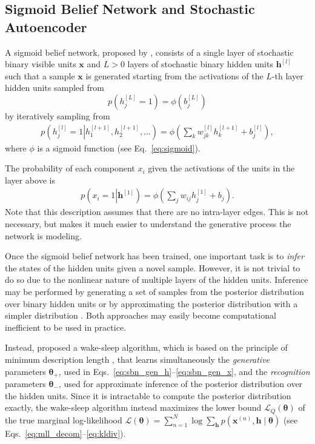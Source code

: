 \documentclass{now}
\newcommand{\qlay}[1]{\left[#1\right]}
\newcommand{\vect}[1]{\mathbf{#1}}
\newcommand{\vects}[1]{\boldsymbol{#1}}
\newcommand{\vh}[0]{\vect{h}}
\newcommand{\vx}[0]{\vect{x}}
\newcommand{\TT}[0]{{\vects{\theta}}}
\newcommand{\LL}[0]{\mathcal{L}}
\begin{document}
\subsection{Sigmoid Belief Network and Stochastic Autoencoder}
\label{sec:sbn_dbn}

A sigmoid belief network, proposed by \citet{Neal1992},
consists of a single layer of stochastic binary visible
units $\vx$ and $L > 0$ layers of stochastic binary
hidden units $\vh^{\qlay{l}}$ such that a sample $\vx$ is
generated starting from the activations of the $L$-th layer
hidden units sampled from
\[
p\left(h_j^{\qlay{L}} = 1\right) = \phi\left( b_j^{\qlay{L}}
\right)
\]
by iteratively sampling from 
\begin{align}
    \label{eq:sbn_gen_h}
    p\left(h_j^{\qlay{l}} = 1 \left| h_1^{\qlay{l+1}},
    h_2^{\qlay{l+1}}, \dots
    \right.\right) = \phi\left( \sum_{k} w_{jk}^{\qlay{l}}
    h_k^{\qlay{l+1}} + b_j^{\qlay{l}}\right),
\end{align}
where $\phi$ is a sigmoid function (see
Eq.~\eqref{eq:sigmoid}). 

The probability of each component $x_i$ given the
activations of the units in the layer above is
\begin{align}
    \label{eq:sbn_gen_x}
    p\left(x_i = 1 \left| \vh^{\qlay{1}}
    \right.\right) = \phi\left( \sum_{j} w_{ij}
    h_j^{\qlay{1}} + b_j\right).
\end{align}
Note that this description assumes that there are no
intra-layer edges. This is not necessary, but makes it much
easier to understand the generative process the network is
modeling.

Once the sigmoid belief network has been trained, one important
task is to \textit{infer} the states of the hidden units given a
novel sample. However, it is not trivial to do so due to the
nonlinear nature of multiple layers of the hidden units.
Inference may be performed by generating a set of samples from
the posterior distribution over binary hidden units 
\citep{Neal1992} or by approximating the posterior distribution with a
simpler distribution \citep[see, e.g.,][]{Saul1996,Jordan1999}.
Both approaches may easily become computational inefficient to
be used in practice. 

Instead, \citet{Hinton1995} proposed a wake-sleep algorithm, which is
based on the principle of minimum description length
\citep{Rissanen1978},
that learns simultaneously the \textit{generative}
parameters $\TT_+$, used in
Eqs.~\eqref{eq:sbn_gen_h}--\eqref{eq:sbn_gen_x}, and the
\textit{recognition} parameters $\TT_-$, used for
approximate inference of the posterior distribution over the
hidden units. Since it is intractable to compute the
posterior distribution exactly, the wake-sleep algorithm
instead maximizes the lower bound $\LL_Q(\TT)$ of the true
marginal log-likelihood $\LL(\TT) = \sum_{n=1}^N \log
\sum_{\vh} p(\vx^{(n)}, \vh \mid \TT)$ (see
Eqs.~\eqref{eq:mll_decom}--\eqref{eq:kldiv}).
\end{document}
